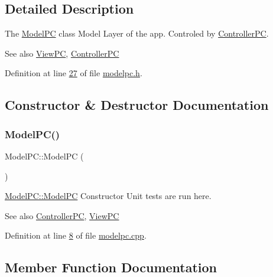 \subsection{Detailed Description}
The \mbox{\hyperlink{class_model_p_c}{Model\+PC}} class Model Layer of the app. Controled by \mbox{\hyperlink{class_controller_p_c}{Controller\+PC}}. 

\begin{DoxySeeAlso}{See also}
\mbox{\hyperlink{class_view_p_c}{View\+PC}}, \mbox{\hyperlink{class_controller_p_c}{Controller\+PC}} 
\end{DoxySeeAlso}


Definition at line \mbox{\hyperlink{modelpc_8h_source_l00027}{27}} of file \mbox{\hyperlink{modelpc_8h_source}{modelpc.\+h}}.



\subsection{Constructor \& Destructor Documentation}
\mbox{\label{class_model_p_c_ae12ebe65ec973c02a0de4850a7c1e31c}} 
\subsubsection{\texorpdfstring{Model\+P\+C()}{ModelPC()}}
{\footnotesize\ttfamily Model\+P\+C\+::\+Model\+PC (\begin{DoxyParamCaption}{ }\end{DoxyParamCaption})}



\mbox{\hyperlink{class_model_p_c_ae12ebe65ec973c02a0de4850a7c1e31c}{Model\+P\+C\+::\+Model\+PC}} Constructor Unit tests are run here. 

\begin{DoxySeeAlso}{See also}
\mbox{\hyperlink{class_controller_p_c}{Controller\+PC}}, \mbox{\hyperlink{class_view_p_c}{View\+PC}} 
\end{DoxySeeAlso}


Definition at line \mbox{\hyperlink{modelpc_8cpp_source_l00008}{8}} of file \mbox{\hyperlink{modelpc_8cpp_source}{modelpc.\+cpp}}.



\subsection{Member Function Documentation}
\mbox{\label{class_model_p_c_a9079a101d83672aa48fd2dbac797de40}} 
